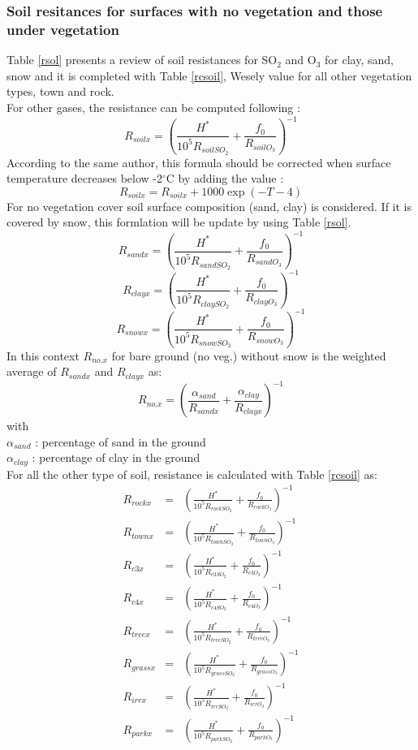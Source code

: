 \subsubsection*{Soil resitances for surfaces with no vegetation and those
under vegetation}
Table \ref{rsol} presents a review of soil resistances for SO$_2$ and O$_3$
for clay, sand, snow and it is completed
with Table \ref{rcsoil}, Wesely value for all other vegetation types, 
town and rock.\\
For other gases, the resistance can be computed following \cite{Wesely1989} :
\[ R_{soilx} = (\frac{H^*}{10^5 R_{soilSO_2}}+ \frac{f_0}{R_{soilO_3}})^{-1} \]
According to the same author, this formula should be corrected when surface
temperature decreases below -2$^\circ$C by adding the value :
\[R_{soilx} =  R_{soilx} + 1000 \exp (-T-4) \]
For no vegetation cover soil surface composition
(sand, clay) is considered. If it is 
covered by snow, this formlation will be update by using Table \ref{rsol}. 
\[ R_{sandx} = (\frac{H^*}{10^5 R_{sandSO_2}}+ \frac{f_0}{R_{sandO_3}})^{-1} \]
\[ R_{clayx} = (\frac{H^*}{10^5 R_{claySO_2}}+ \frac{f_0}{R_{clayO_3}})^{-1} \]
\[ R_{snowx} = (\frac{H^*}{10^5 R_{snowSO_2}}+ \frac{f_0}{R_{snowO_3}})^{-1} \]
In this context $R_{no.x}$ for bare ground (no veg.) without snow is
the weighted average of $R_{sandx}$ and $R_{clayx}$ as: 
$$ R_{no.x} = ( \frac{\alpha_{sand}}{R_{sandx}} +
                \frac{\alpha_{clay}}{R_{clayx}} )^{-1} $$
with\\
$\alpha_{sand}$ : percentage of sand in the ground \\
$\alpha_{clay}$ : percentage of clay in the ground \\
For all the other type of soil, resistance is calculated with Table
\ref{rcsoil} as:
\begin{eqnarray*} 
R_{rockx} & = & (\frac{H^*}{10^5 R_{rockSO_2}}+
        \frac{f_0}{R_{rockO_3}})^{-1}  \\
R_{townx} & = & (\frac{H^*}{10^5 R_{townSO_2}}+
        \frac{f_0}{R_{townO_3}})^{-1} \\
R_{c3x} & = & (\frac{H^*}{10^5 R_{c3SO_2}}+ \frac{f_0}{R_{c3O_3}})^{-1} \\
R_{c4x} & = & (\frac{H^*}{10^5 R_{c4SO_2}}+ \frac{f_0}{R_{c4O_3}})^{-1} \\
R_{treex} & = & (\frac{H^*}{10^5 R_{treeSO_2}}+
        \frac{f_0}{R_{treeO_3}})^{-1} \\
R_{grassx} & = & (\frac{H^*}{10^5 R_{grassSO_2}}+
        \frac{f_0}{R_{grassO_3}})^{-1} \\
R_{irrx} & = & (\frac{H^*}{10^5 R_{irrSO_2}}+
        \frac{f_0}{R_{irrO_3}})^{-1} \\
R_{parkx} & = & (\frac{H^*}{10^5 R_{parkSO_2}}+
        \frac{f_0}{R_{parkO_3}})^{-1} \\
\end{eqnarray*}

